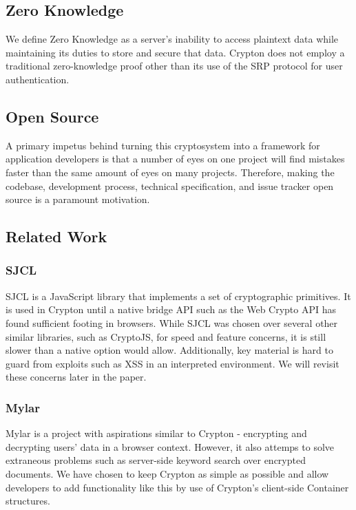 \documentclass[conference]{IEEEtran}
\begin{document}
\subsection{Zero Knowledge}
We define Zero Knowledge as a server's inability to access plaintext data while
maintaining its duties to store and secure that data. Crypton does not employ a
traditional zero-knowledge proof other than its use of the SRP\cite{SRP}
protocol for user authentication.

\subsection{Open Source}
A primary impetus behind turning this cryptosystem into a framework for
application developers is that a number of eyes on one project will find mistakes
faster than the same amount of eyes on many projects. Therefore,
making the codebase, development process, technical specification,
and issue tracker open source is a paramount motivation.

\subsection{Related Work}

\subsubsection{SJCL}
SJCL is a JavaScript library that implements a set of cryptographic 
primitives\cite{sjcl}. It is used in Crypton until a native bridge API
such as the Web Crypto API has found sufficient footing in browsers.
While SJCL was chosen over several other similar libraries, such as
CryptoJS\cite{cryptojs}, for speed and feature concerns,
it is still slower than a native option would allow. Additionally,
key material is hard to guard from exploits such as XSS in an interpreted
environment. We will revisit these concerns later in the paper.

\subsubsection{Mylar}
Mylar\cite{mylar} is a project with aspirations similar to
Crypton - encrypting and decrypting users' data in a browser context.
However, it also attemps\cite{mylarpaper} to solve extraneous problems
such as server-side keyword search over encrypted documents. We have chosen
to keep Crypton as simple as possible and allow developers to add functionality
like this by use of Crypton's client-side Container structures.
\end{document}
